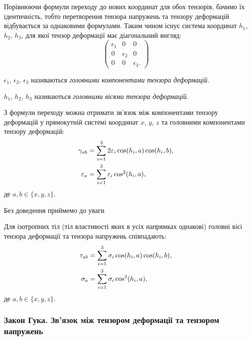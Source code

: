 Порівнюючи формули переходу до нових координат для обох тензорів, бачимо їх ідентичність, тобто перетворення тензора напружень та тензору деформацій відбувається за однаковими формулами. Таким чином існує система координат $h_1$, $h_2$, $h_3$, для якої тензор деформації має діагональний вигляд: 
\begin{equation}
	\begin{pmatrix}
		\epsilon_1 & 0 & 0 \\
		0 & \epsilon_2 & 0 \\
		0 & 0 & \epsilon_3.
	\end{pmatrix}
\end{equation}

\begin{definition}
 	$\epsilon_1$, $\epsilon_2$, $\epsilon_3$ називаються \it{головними компонентами} тензора деформацій.
\end{definition} 

\begin{definition}
	$h_1$, $h_2$, $h_3$ називаються \it{головними вісями} тензора деформацій.
\end{definition}

З формули переходу можна отримати зв'язок між компонентами тензору деформацій у прямокутній системі координат $x$, $y$, $z$ та головними компонентами тензору деформацій:
\begin{align}
	\gamma_{a b} &= \displaystyle\sum\limits_{i = 1}^3 2 \varepsilon_i \cos (h_i, a) \cos (h_i, b), \\
	\varepsilon_a &= \displaystyle\sum\limits_{i = 1}^3 \varepsilon_i \cos^2(h_i, a),
\end{align}
де $a, b \in \{x, y, z\}$. \medskip

Без доведення приймемо до уваги 

\begin{proposition}
	Для ізотропних тіл (тіл властивості яких в усіх напрямках однакові) головні вісі тензора деформації та тензора напружень співпадають:
	\begin{align}
		\tau_{a b} &= \displaystyle\sum\limits_{i = 1}^3  \sigma_i \cos (h_i, a) \cos (h_i, b), \\
		\sigma_a &= \displaystyle\sum\limits_{i = 1}^3 \sigma_i \cos^2(h_i, a),
	\end{align}
	де $a, b \in \{x, y, z\}$.
\end{proposition}

\subsubsection{Закон Гука. Зв'язок між тензором деформації та тензором напружень}


